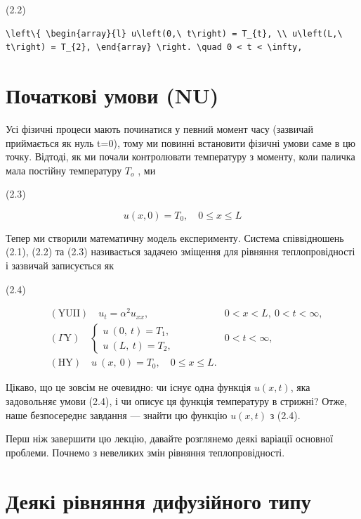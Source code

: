 \documentclass[
  ukrainian,
]{article}
\begin{document}
(2.2)

\begin{verbatim}
\left\{ \begin{array}{l} u\left(0,\ t\right) = T_{t}, \\ u\left(L,\ t\right) = T_{2}, \end{array} \right. \quad 0 < t < \infty,
\end{verbatim}

\section{Початкові умови
(NU)}\label{ux43fux43eux447ux430ux442ux43aux43eux432ux456-ux443ux43cux43eux432ux438-nu}

Усі фізичні процеси мають починатися у певний момент часу (зазвичай
приймається як нуль t=0), тому ми повинні встановити фізичні умови саме
в цю точку. Відтоді, як ми почали контролювати температуру з моменту,
коли паличка мала постійну температуру \(T_{\mathrm{ }o}\) , ми

(2.3)

\[
u(x, 0) = T_0, \quad 0 \le x \le L
\]

Тепер ми створили математичну модель експерименту. Система співвідношень
(2.1), (2.2) та (2.3) називається задачею зміщення для рівняння
теплопровідності і зазвичай записується як

(2.4)

\[
\begin{aligned} & (\text{YUII}) \quad u_t = \alpha^2 u_{xx}, & 0 < x < L, \ 0 < t < \infty, \\ & \left( \Gamma \text{Y} \right) \quad \begin{cases} u \ (0, \ t) = T_1, \\ u \ (L, \ t) = T_2, \end{cases} & 0 < t < \infty, \\ & (\text{HY}) \quad u \ (x, \ 0) = T_0, \quad 0 \leqslant x \leqslant L. \end{aligned}
\]

Цікаво, що це зовсім не очевидно: чи існує одна функція \(u(x, t)\), яка
задовольняє умови (2.4), і чи описує ця функція температуру в стрижні?
Отже, наше безпосереднє завдання --- знайти цю функцію \(u(x, t)\) з
(2.4).

Перш ніж завершити цю лекцію, давайте розглянемо деякі варіації основної
проблеми. Почнемо з невеликих змін рівняння теплопровідності.

\section{Деякі рівняння дифузійного
типу}\label{ux434ux435ux44fux43aux456-ux440ux456ux432ux43dux44fux43dux43dux44f-ux434ux438ux444ux443ux437ux456ux439ux43dux43eux433ux43e-ux442ux438ux43fux443}
\end{document}
